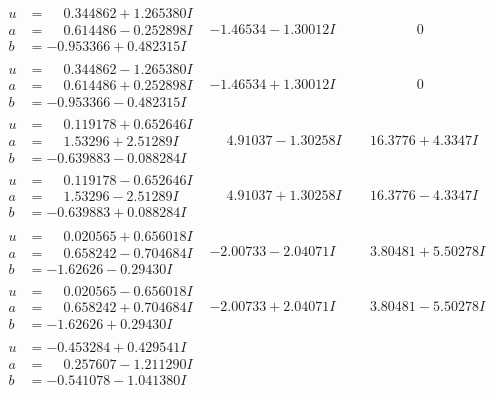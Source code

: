 \documentclass[1p]{elsarticle_modified}
\theoremstyle{definition}
\begin{document}
$$\begin{array}{c|c|c}
\begin{aligned}
u &= \phantom{-}0.344862 + 1.265380 I \\
a &= \phantom{-}0.614486 - 0.252898 I \\
b &= -0.953366 + 0.482315 I\end{aligned}
 & -1.46534 - 1.30012 I & \phantom{-0.000000 } 0 \\ \hline\begin{aligned}
u &= \phantom{-}0.344862 - 1.265380 I \\
a &= \phantom{-}0.614486 + 0.252898 I \\
b &= -0.953366 - 0.482315 I\end{aligned}
 & -1.46534 + 1.30012 I & \phantom{-0.000000 } 0 \\ \hline\begin{aligned}
u &= \phantom{-}0.119178 + 0.652646 I \\
a &= \phantom{-}1.53296 + 2.51289 I \\
b &= -0.639883 - 0.088284 I\end{aligned}
 & \phantom{-}4.91037 - 1.30258 I & \phantom{-}16.3776 + 4.3347 I \\ \hline\begin{aligned}
u &= \phantom{-}0.119178 - 0.652646 I \\
a &= \phantom{-}1.53296 - 2.51289 I \\
b &= -0.639883 + 0.088284 I\end{aligned}
 & \phantom{-}4.91037 + 1.30258 I & \phantom{-}16.3776 - 4.3347 I \\ \hline\begin{aligned}
u &= \phantom{-}0.020565 + 0.656018 I \\
a &= \phantom{-}0.658242 - 0.704684 I \\
b &= -1.62626 - 0.29430 I\end{aligned}
 & -2.00733 - 2.04071 I & \phantom{-}3.80481 + 5.50278 I \\ \hline\begin{aligned}
u &= \phantom{-}0.020565 - 0.656018 I \\
a &= \phantom{-}0.658242 + 0.704684 I \\
b &= -1.62626 + 0.29430 I\end{aligned}
 & -2.00733 + 2.04071 I & \phantom{-}3.80481 - 5.50278 I \\ \hline\begin{aligned}
u &= -0.453284 + 0.429541 I \\
a &= \phantom{-}0.257607 - 1.211290 I \\
b &= -0.541078 - 1.041380 I\end{aligned}

\end{array}$$
\end{document}
